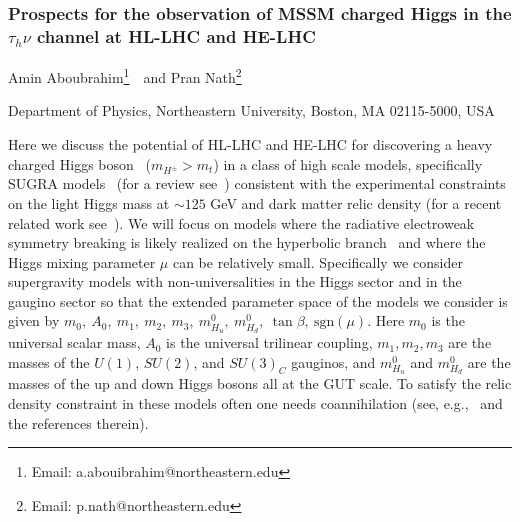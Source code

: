 \subsubsection{Prospects for the observation of MSSM charged Higgs in the $\tau_h\nu$ channel at HL-LHC and HE-LHC}
\begin{center}
 {Amin Aboubrahim\footnote{Email: a.abouibrahim@northeastern.edu}~\ and 
Pran Nath\footnote{Email: p.nath@northeastern.edu}
}
\end{center}
\begin{center}
Department of Physics, Northeastern University, Boston, MA 02115-5000, USA
\end{center}
Here we discuss the potential of HL-LHC and HE-LHC for discovering a heavy charged Higgs boson~\cite{Aboubrahim:2018tpf} ($m_{H^{\pm}} > m_t$) in a class of high scale models, specifically SUGRA models~\cite{Chamseddine:1982jx,*Nath:1983aw,*Hall:1983iz} (for a review see~\cite{Nath:2016qzm}) consistent with the experimental constraints on the light Higgs mass at $\sim 125$ GeV and dark matter relic density (for a recent related work see~\cite{Aboubrahim:2018bil}).  We will focus on models where the
radiative  electroweak symmetry breaking is likely realized on the hyperbolic branch~\cite{Chan:1997bi}
and where the Higgs mixing parameter $\mu$ can be relatively small. Specifically we consider supergravity models with  non-universalities in  the Higgs sector and in the gaugino sector so that 
the extended parameter space of the models we consider is given by $m_0, ~A_0, ~m_1, ~m_2, ~m_3, ~m^0_{H_u}, ~m^0_{H_d}, ~\tan\beta, ~\text{sgn}(\mu)$.
Here $m_0$ is the universal scalar mass, $A_0$ is the universal trilinear coupling, 
$m_1,  m_2, m_3$ are the masses of the $U(1)$, $SU(2)$, and $SU(3)_C$ gauginos, and $m^0_{H_u}$ and $m^0_{H_d}$ are the 
masses of the up and down Higgs bosons all at the GUT scale. To satisfy the relic density constraint in these models often
one needs  coannihilation (see, e.g.,~\cite{Aboubrahim:2017aen,Aboubrahim:2017wjl} and the references therein).

